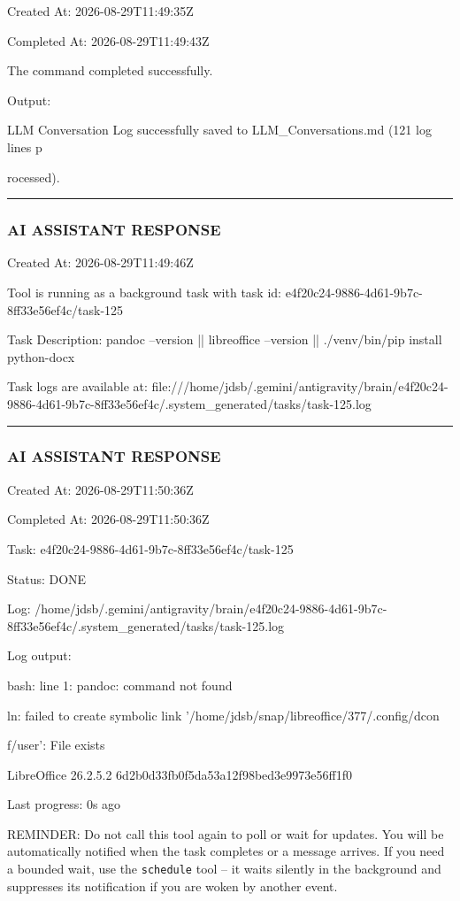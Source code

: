 \documentclass[11pt,a4paper]{article}
\begin{document}
{Created At: 2026-08-29T11:49:35Z

Completed At: 2026-08-29T11:49:43Z


The command completed successfully.

Output:

LLM Conversation Log successfully saved to LLM\_Conversations.md (121 log lines p

rocessed).


\hrule

\subsubsection{AI ASSISTANT RESPONSE}

Created At: 2026-08-29T11:49:46Z

Tool is running as a background task with task id: e4f20c24-9886-4d61-9b7c-8ff33e56ef4c/task-125

Task Description: pandoc --version || libreoffice --version || ./venv/bin/pip install python-docx

Task logs are available at: file:///home/jdsb/.gemini/antigravity/brain/e4f20c24-9886-4d61-9b7c-8ff33e56ef4c/.system\_generated/tasks/task-125.log


\hrule

\subsubsection{AI ASSISTANT RESPONSE}

Created At: 2026-08-29T11:50:36Z

Completed At: 2026-08-29T11:50:36Z

Task: e4f20c24-9886-4d61-9b7c-8ff33e56ef4c/task-125

Status: DONE

Log: /home/jdsb/.gemini/antigravity/brain/e4f20c24-9886-4d61-9b7c-8ff33e56ef4c/.system\_generated/tasks/task-125.log

Log output:

bash: line 1: pandoc: command not found

ln: failed to create symbolic link '/home/jdsb/snap/libreoffice/377/.config/dcon

f/user': File exists

LibreOffice 26.2.5.2 6d2b0d33fb0f5da53a12f98bed3e9973e56ff1f0


Last progress: 0s ago



REMINDER: Do not call this tool again to poll or wait for updates. You will be automatically notified when the task completes or a message arrives. If you need a bounded wait, use the \texttt{schedule} tool -- it waits silently in the background and suppresses its notification if you are woken by another event.


}
\end{document}
